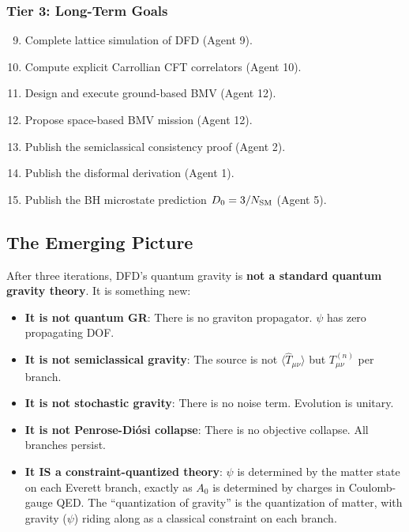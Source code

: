 \documentclass[11pt,a4paper]{article}
\begin{document}
\subsubsection{Tier 3: Long-Term Goals}

\begin{enumerate}
\setcounter{enumi}{8}
\item Complete lattice simulation of DFD (Agent 9).
\item Compute explicit Carrollian CFT correlators (Agent 10).
\item Design and execute ground-based BMV (Agent 12).
\item Propose space-based BMV mission (Agent 12).
\item Publish the semiclassical consistency proof (Agent 2).
\item Publish the disformal derivation (Agent 1).
\item Publish the BH microstate prediction $D_0 = 3/N_{\rm SM}$ (Agent 5).
\end{enumerate}

\subsection{The Emerging Picture}

After three iterations, DFD's quantum gravity is \textbf{not a standard quantum gravity theory}. It is something new:

\begin{itemize}
\item \textbf{It is not quantum GR}: There is no graviton propagator. $\psi$ has zero propagating DOF.
\item \textbf{It is not semiclassical gravity}: The source is not $\langle\hat{T}_{\mu\nu}\rangle$ but $T_{\mu\nu}^{(n)}$ per branch.
\item \textbf{It is not stochastic gravity}: There is no noise term. Evolution is unitary.
\item \textbf{It is not Penrose-Di\'osi collapse}: There is no objective collapse. All branches persist.
\item \textbf{It IS a constraint-quantized theory}: $\psi$ is determined by the matter state on each Everett branch, exactly as $A_0$ is determined by charges in Coulomb-gauge QED. The ``quantization of gravity'' is the quantization of matter, with gravity ($\psi$) riding along as a classical constraint on each branch.
\end{itemize}
\end{document}
